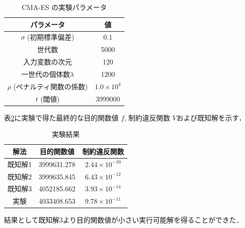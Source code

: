 \documentclass[twocolumn]{jarticle}
\begin{document}
\begin{table}[htbp]
    \begin{center}
        \caption{CMA-ES の実験パラメータ}
        \label{setting_cmaes}
        \begin{tabular}{| c | c |} 
            \hline
            パラメータ & 値 \\ 
            \hline
            $\sigma$ (初期標準偏差) &  0.1 \\
            世代数 & 5000 \\
            入力変数の次元 & 120 \\
            一世代の個体数$\lambda$ & 1200 \\
            $\rho$ (ペナルティ関数の係数) & $1.0\times10^{4}$\\
            $t$ (閾値) & 3999000 \\
            \hline
        \end{tabular}
    \end{center}
\end{table}

表\ref{result}に実験で得た最終的な目的関数値 $f$, 制約違反関数 $V$および既知解を示す．
\begin{table}[htbp]
    \begin{center}
        \caption{実験結果}
        \label{result}
        \begin{tabular}{|c|c|c|}
            \hline
            解法 & 目的関数値 & 制約違反関数 \\ 
            \hline
            既知解1 & 3999631.278 & $2.44 \times 10^{-10}$ \\
            既知解2 & 3999635.845 & $6.43 \times 10^{-12}$ \\
            既知解3 & 4052185.662 & $3.93 \times 10^{-14}$ \\
            実験    & 4033408.653 & $9.78 \times 10^{-11}$ \\
            \hline
        \end{tabular}
    \end{center}
\end{table}
結果として既知解3より目的関数値が小さい実行可能解を得ることができた．
\end{document}
